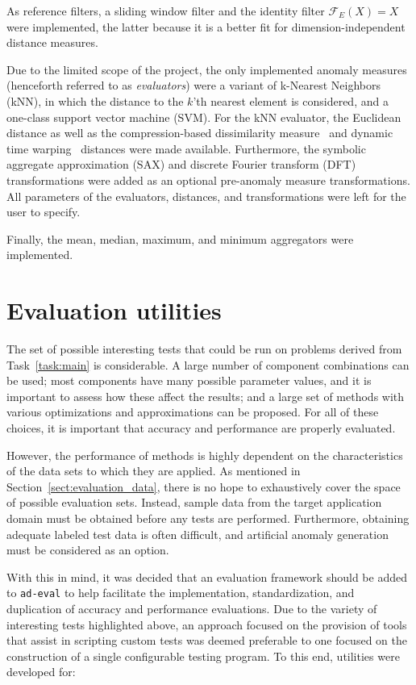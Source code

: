 As reference filters, a sliding window filter and the identity filter $\mathcal{F}_E(X)=X$ were implemented, the latter because it is a better fit for dimension-independent distance measures.

Due to the limited scope of the project, the only implemented anomaly measures (henceforth referred to as \emph{evaluators}) were a variant of k-Nearest Neighbors (kNN), in which the distance to the $k$'th nearest element is considered, and a one-class support vector machine (SVM). For the kNN evaluator, the Euclidean distance as well as the compression-based dissimilarity measure~\cite{keogh2} and dynamic time warping~\cite{dtw} distances were made available. Furthermore, the symbolic aggregate approximation (SAX) and discrete Fourier transform (DFT) transformations were added as an optional pre-anomaly measure transformations. All parameters of the evaluators, distances, and transformations were left for the user to specify.


Finally, the mean, median, maximum, and minimum aggregators were implemented.

\section{Evaluation utilities}
\label{sect:evaluation_package}

The set of possible interesting tests that could be run on problems derived from Task~\ref{task:main} is considerable. A large number of component combinations can be used; most components have many possible parameter values, and it is important to assess how these affect the results; and a large set of methods with various optimizations and approximations can be proposed. For all of these choices, it is important that accuracy and performance are properly evaluated.

However, the performance of methods is highly dependent on the characteristics of the data sets to which they are applied. As mentioned in Section~\ref{sect:evaluation_data}, there is no hope to exhaustively cover the space of possible evaluation sets. Instead, sample data from the target application domain must be obtained before any tests are performed. Furthermore, obtaining adequate labeled test data is often difficult, and artificial anomaly generation must be considered as an option.

With this in mind, it was decided that an evaluation framework should be added to \texttt{ad-eval} to help facilitate the implementation, standardization, and duplication of accuracy and performance evaluations. Due to the variety of interesting tests highlighted above, an approach focused on the provision of tools that assist in scripting custom tests was deemed preferable to one focused on the construction of a single configurable testing program. To this end, utilities were developed for:

